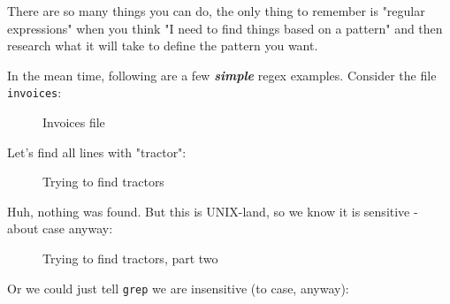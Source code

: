 \documentclass[10pt,american,]{book}
\newenvironment{Shaded}{\begin{snugshade}}{\end{snugshade}}
\newcommand{\KeywordTok}[1]{\textcolor[rgb]{0.13,0.29,0.53}{\textbf{{#1}}}}
\newcommand{\NormalTok}[1]{{#1}}
\numberwithin{figure}{chapter}
\DeclareRobustCommand{\drcap}[1]{\begin{figure}[H]\caption{#1}\end{figure}}
\renewcommand{\KeywordTok}[1]{{#1}}
\renewcommand{\NormalTok}[1]{{#1}}
\begin{document}
There are so many things you can do, the only thing to remember is
"regular expressions" when you think "I need to find things based on a
pattern" and then research what it will take to define the pattern you
want.

In the mean time, following are a few \textbf{\emph{simple}} regex
examples. Consider the file \texttt{invoices}:

\drcap{Invoices file}

\begin{Shaded}
\end{Shaded}

Let's find all lines with "tractor":

\drcap{Trying to find tractors}

\begin{Shaded}
\end{Shaded}

Huh, nothing was found. But this is UNIX-land, so we know it is
sensitive - about case anyway:

\drcap{Trying to find tractors, part two}

\begin{Shaded}
\end{Shaded}

Or we could just tell \texttt{grep} we are insensitive (to case,
anyway):
\end{document}
